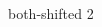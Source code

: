 \begin{columns}[b]
\begin{column}{0.45\linewidth}
\begin{overlayarea}{\linewidth}{2.9cm}
{        \vspace{-0.5cm}
        \begin{center}
          {\small both-shifted 2}
        \end{center}}
    \end{overlayarea}
  \end{column}
\end{columns}
